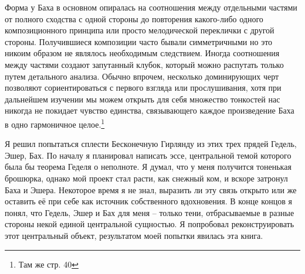 \documentclass[../main.tex]{subfiles}
\begin{document}
Форма у Баха в основном опиралась на соотношения между отдельными частями от полного сходства с одной стороны до повторения какого-либо одного композиционного принципа или просто мелодической переклички с другой стороны. Получившиеся композиции часто бывали симметричными но это никоим образом не являлось необходимым следствием. Иногда соотношения между частями создают запутанный клубок, который можно распутать только путем детального анализа. Обычно впрочем, несколько доминирующих черт позволяют сориентироваться с первого взгляда или прослушивания, хотя при дальнейшем изучении мы можем открыть для себя множество тонкостей нас никогда не покидает чувство единства, связывающего каждое произведение Баха в одно гармоничное целое.\footnote{Там же стр. 40}

Я решил попытаться сплести Бесконечную Гирлянду из этих трех прядей Гедель, Эшер, Бах. По началу я планировал написать эссе, центральной темой которого была бы теорема Геделя о неполноте. Я думал, что у меня получится тоненькая брошюрка, однако мой проект стал расти, как снежный ком, и вскоре затронул Баха и Эшера. Некоторое время я не знал, выразить ли эту связь открыто или же оставить её при себе как источник собственного вдохновения. В конце концов я понял, что Гедель, Эшер и Бах для меня \--- только тени, отбрасываемые в разные стороны некой единой центральной сущностью. Я попробовал реконструировать этот центральный объект, результатом моей попытки явилась эта книга.
\end{document}

